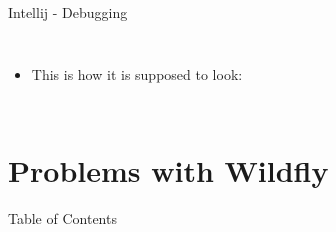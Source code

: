 \documentclass[aspectratio=1610,english]{beamer} %
\begin{document}
	\begin{frame}{Intellij - Debugging}
		\begin{columns}
				\begin{itemize}
					\tiny
					\color{black}
					\item This is how it is supposed to look:
				\end{itemize}
				\begin{minipage}{\textwidth}
				\end{minipage}
		\end{columns}
	\end{frame}
	\part{Problems with Wildfly}
  	\begin{frame}{Table of Contents}
  		\tableofcontents
  	\end{frame}
\end{document}
